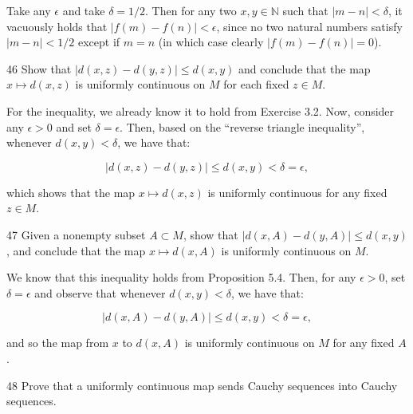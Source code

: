 \begin{solution}
    
    Take any $\epsilon$ and take $\delta = 1/2$.
    Then for any two $x, y \in \mathbb{N}$ such that $\lvert m - n \rvert < \delta$, it vacuously holds that $\lvert f(m) - f(n) \rvert < \epsilon$, since no two natural numbers satisfy $\lvert m - n \rvert < 1/2$ except if $m = n$ (in which case clearly $\lvert f(m) - f(n) \rvert = 0$).
\end{solution}

\newpage

\begin{exercise}{46}
    Show that $\lvert d(x, z) - d(y, z) \rvert \leq d(x, y)$ and conclude that the map $x \mapsto d(x, z)$ is uniformly continuous on $M$ for each fixed $z \in M$.
\end{exercise}

\begin{solution}
    
    For the inequality, we already know it to hold from Exercise 3.2.
    Now, consider any $\epsilon > 0$ and set $\delta = \epsilon$.
    Then, based on the ``reverse triangle inequality'', whenever $d(x, y) < \delta$, we have that:

    \[\lvert d(x, z) - d(y, z) \rvert \leq d(x, y) < \delta = \epsilon,\]

    which shows that the map $x \mapsto d(x, z)$ is uniformly continuous for any fixed $z \in M$.
\end{solution}

\begin{exercise}{47}
    Given a nonempty subset $A \subset M$, show that $\lvert d(x, A) - d(y, A) \rvert \leq d(x, y)$, and conclude that the map $x \mapsto d(x, A)$ is uniformly continuous on $M$.
\end{exercise}

\begin{solution}
    
    We know that this inequality holds from Proposition 5.4.
    Then, for any $\epsilon > 0$, set $\delta = \epsilon$ and observe that whenever $d(x, y) < \delta$, we have that:

    \[\lvert d(x, A) - d(y, A) \rvert \leq d(x, y) < \delta = \epsilon,\]

    and so the map from $x$ to $d(x, A)$ is uniformly continuous on $M$ for any fixed $A$.
\end{solution}

\begin{exercise}{48}
    Prove that a uniformly continuous map sends Cauchy sequences into Cauchy sequences.
\end{exercise}

